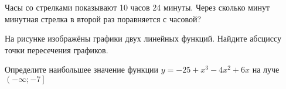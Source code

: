 \begin{taskBN}{9}
Часы со стрелками показывают 10 часов 24 минуты. Через сколько минут минутная стрелка в второй раз поравняется с часовой?
\end{taskBN}

\begin{taskBN}{10}
На рисунке изображёны графики двух линейных функций. Найдите абсциссу точки пересечения графиков.
\end{taskBN}

\begin{taskBN}{11}
Определите наибольшее значение функции $y = -25+x^{3}-4x^{2}+6x$ на луче $\left(-\infty;-7 \right]$
\end{taskBN}

